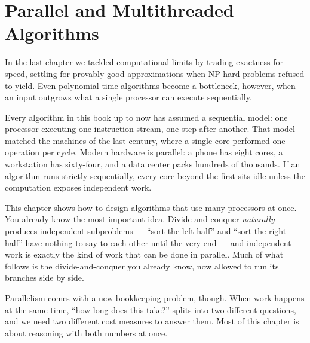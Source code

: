 \chapter{Parallel and Multithreaded Algorithms}
\label{ch35:parallel}

In the last chapter we tackled computational limits by trading exactness for
speed, settling for provably good approximations when NP-hard problems refused to
yield. Even polynomial-time algorithms become a bottleneck, however, when an input outgrows
what a single processor can execute sequentially.

Every algorithm in this book up to now has assumed a sequential model: one processor executing one instruction
stream, one step after another. That model matched the machines of the last
century, where a single core performed one operation per cycle. Modern hardware
is parallel: a phone has eight cores, a workstation has sixty-four, and
a data center packs hundreds of thousands. If an algorithm runs strictly
sequentially, every core beyond the first sits idle unless the computation
exposes independent work.

This chapter shows how to design algorithms that use many processors at once. You already
know the most important idea. Divide-and-conquer \emph{naturally} produces
independent subproblems --- ``sort the left half'' and ``sort the right half''
have nothing to say to each other until the very end --- and independent work is
exactly the kind of work that can be done in parallel. Much of what follows is
the divide-and-conquer you already know, now allowed to run its branches side by
side.

Parallelism comes with a new bookkeeping problem, though. When work happens at
the same time, ``how long does this take?'' splits into two different questions,
and we need two different cost measures to answer them. Most of this chapter is
about reasoning with both numbers at once.

